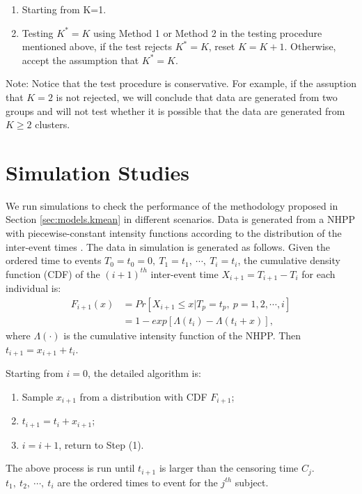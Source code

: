 \documentclass[12pt]{article}
\begin{document}
\begin{enumerate}[Step 1:]
  
\item Starting from K=1.
\item Testing $K^*=K$ using Method 1 or Method 2 in the testing procedure mentioned above, if the test rejects $K^*=K$, reset $K=K+1$. Otherwise, accept the assumption that $K^*=K$.

  
\end{enumerate}

Note:
  Notice that the test procedure is conservative. For example, if the assuption that $K=2$ is not rejected, we will conclude that data are generated from two groups and will not test whether it is possible that the data are generated from $K \geq 2$ clusters.







\section{Simulation Studies}\label{sec:simulation}
We run simulations to check the performance of the methodology proposed in Section \ref{sec:models.kmean} in different scenarios. Data is generated from a NHPP with piecewise-constant intensity functions according to the distribution of the inter-event times \citep{Klein1984}. The data in simulation is generated as follows. Given the ordered time to events $T_0=t_0=0, ~T_1=t_1, ~\cdots, ~T_{i}=t_{i}$, the cumulative density function (CDF) of the $(i+1)^{th}$ inter-event time $X_{i+1}=T_{i+1}-T_{i}$ for each individual is: 
\begin{equation}\label{eqn:Ft}
\begin{aligned}
 F_{i+1}(x)&=Pr\left[ X_{i+1}\leq x|T_p=t_p,~p=1,2, \cdots, i\right] \\
&=1-exp\left[ \varLambda(t_{i})-\varLambda(t_{i}+x)\right],
\end{aligned}
\end{equation}
where  $\varLambda(\cdot)$ is the cumulative intensity function of the NHPP. Then $t_{i+1}=x_{i+1}+t_i$. 

Starting from $i=0$, the detailed algorithm is: 
\begin{enumerate}[Step 1:]
  \item Sample $x_{i+1}$ from a distribution with CDF $F_{i+1}$;
  \item $t_{i+1}=t_{i}+x_{i+1}$;
  \item $i=i+1$, return to Step (1).
\end{enumerate} 
The above process is run until $t_{i+1}$ is larger than the censoring time $C_j$. $t_1, ~t_2,~ \cdots, ~t_i$ are the ordered times to event for the $j^{th}$ subject. 
\end{document}
